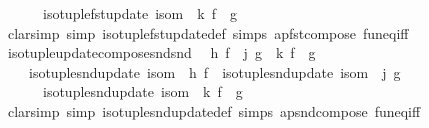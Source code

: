 \begin{isabellebody}
\ \ \ \ \ \ {\isacharparenleft}{\kern0pt}iso{\isacharunderscore}{\kern0pt}tuple{\isacharunderscore}{\kern0pt}fst{\isacharunderscore}{\kern0pt}update\ isom\ {\isasymcirc}\ k{\isacharparenright}{\kern0pt}\ {\isacharparenleft}{\kern0pt}f\ {\isasymcirc}\ g{\isacharparenright}{\kern0pt}{\isachardoublequoteclose}\isanewline
%
\isadelimproof
\ \ %
\endisadelimproof
%
\isatagproof
{}\isamarkupfalse%
\ {\isacharparenleft}{\kern0pt}clarsimp\ simp{\isacharcolon}{\kern0pt}\ iso{\isacharunderscore}{\kern0pt}tuple{\isacharunderscore}{\kern0pt}fst{\isacharunderscore}{\kern0pt}update{\isacharunderscore}{\kern0pt}def\ simps\ apfst{\isacharunderscore}{\kern0pt}compose\ fun{\isacharunderscore}{\kern0pt}eq{\isacharunderscore}{\kern0pt}iff{\isacharparenright}{\kern0pt}%
\endisatagproof
{\isafoldproof}%
%
\isadelimproof
\isanewline
%
\endisadelimproof
\isanewline
{}\isamarkupfalse%
\ iso{\isacharunderscore}{\kern0pt}tuple{\isacharunderscore}{\kern0pt}update{\isacharunderscore}{\kern0pt}compose{\isacharunderscore}{\kern0pt}snd{\isacharunderscore}{\kern0pt}snd{\isacharcolon}{\kern0pt}\isanewline
\ \ {\isachardoublequoteopen}h\ f\ {\isasymcirc}\ j\ g\ {\isacharequal}{\kern0pt}\ k\ {\isacharparenleft}{\kern0pt}f\ {\isasymcirc}\ g{\isacharparenright}{\kern0pt}\ {\isasymLongrightarrow}\isanewline
\ \ \ \ {\isacharparenleft}{\kern0pt}iso{\isacharunderscore}{\kern0pt}tuple{\isacharunderscore}{\kern0pt}snd{\isacharunderscore}{\kern0pt}update\ isom\ {\isasymcirc}\ h{\isacharparenright}{\kern0pt}\ f\ {\isasymcirc}\ {\isacharparenleft}{\kern0pt}iso{\isacharunderscore}{\kern0pt}tuple{\isacharunderscore}{\kern0pt}snd{\isacharunderscore}{\kern0pt}update\ isom\ {\isasymcirc}\ j{\isacharparenright}{\kern0pt}\ g\ {\isacharequal}{\kern0pt}\isanewline
\ \ \ \ \ \ {\isacharparenleft}{\kern0pt}iso{\isacharunderscore}{\kern0pt}tuple{\isacharunderscore}{\kern0pt}snd{\isacharunderscore}{\kern0pt}update\ isom\ {\isasymcirc}\ k{\isacharparenright}{\kern0pt}\ {\isacharparenleft}{\kern0pt}f\ {\isasymcirc}\ g{\isacharparenright}{\kern0pt}{\isachardoublequoteclose}\isanewline
%
\isadelimproof
\ \ %
\endisadelimproof
%
\isatagproof
{}\isamarkupfalse%
\ {\isacharparenleft}{\kern0pt}clarsimp\ simp{\isacharcolon}{\kern0pt}\ iso{\isacharunderscore}{\kern0pt}tuple{\isacharunderscore}{\kern0pt}snd{\isacharunderscore}{\kern0pt}update{\isacharunderscore}{\kern0pt}def\ simps\ apsnd{\isacharunderscore}{\kern0pt}compose\ fun{\isacharunderscore}{\kern0pt}eq{\isacharunderscore}{\kern0pt}iff{\isacharparenright}{\kern0pt}%
\endisatagproof
{\isafoldproof}%
%
\isadelimproof
\isanewline

\end{isabellebody}
